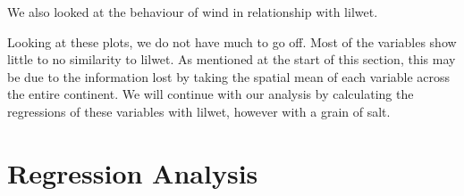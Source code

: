 \documentclass[../main.tex]{subfiles}
\begin{document}
We also looked at the behaviour of wind in relationship with \gls{lilwet}.

Looking at these plots, we do not have much to go off. Most of the variables show little to no similarity to \gls{lilwet}. As mentioned at the start of this section, this may be due to the information lost by taking the spatial mean of each variable across the entire continent. We will continue with our analysis by calculating the regressions of these variables with \gls{lilwet}, however with a grain of salt. 

\FloatBarrier

\section{Regression Analysis}
\end{document}
